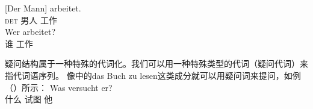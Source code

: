 \eal
\ex 
\gll {}[Der Mann] arbeitet.\\
	 \spacebr{}\textsc{det} 男人 工作\\
\ex 
\gll Wer arbeitet?\\
	 谁 工作\\
\zl

\noindent
疑问结构属于一种特殊的代词化。我们可以用一种特殊类型的代词（疑问代词）来指代词语序列。
像中的das Buch zu lesen这类成分就可以用疑问词来提问，如例（）所示：
\ea
\gll Was versucht er?\\
     什么 试图 他\\
\z


